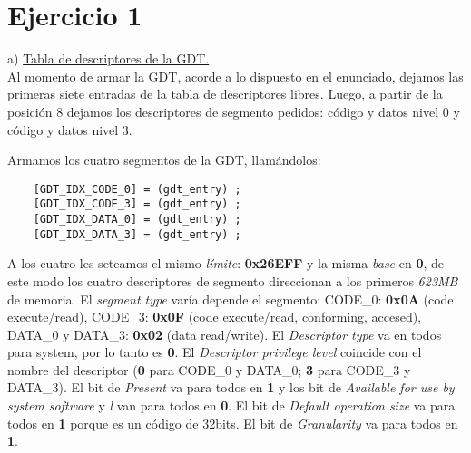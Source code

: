 \documentclass[a4paper]{article}
\begin{document}
\thispagestyle{empty}

 


\maketitle
\newpage


\newpage


\newpage
\section{Ejercicio 1}
{\large a)} \underline{Tabla de descriptores de la GDT.} \\

Al momento de armar la GDT, acorde a lo dispuesto en el enunciado, dejamos las primeras siete entradas de la tabla de descriptores libres. Luego, a partir de la posici\'on 8 dejamos los descriptores de segmento pedidos: c\'odigo y datos nivel 0 y c\'odigo y datos nivel 3.

Armamos los cuatro segmentos de la GDT, llam\'andolos: 
\begin{codesnippet}
\begin{verbatim}
    [GDT_IDX_CODE_0] = (gdt_entry) ; 
    [GDT_IDX_CODE_3] = (gdt_entry) ; 
    [GDT_IDX_DATA_0] = (gdt_entry) ;  
    [GDT_IDX_DATA_3] = (gdt_entry) ; 
\end{verbatim}
\end{codesnippet}
    
A los cuatro les seteamos el mismo \emph{l\'imite}: \textbf{0x26EFF} y la misma \emph{base} en \textbf{0}, de este modo los cuatro descriptores de segmento direccionan a los primeros \emph{623MB} de memoria. El \emph{segment type} var\'ia depende el segmento: CODE_0: \textbf{0x0A} (code execute/read), CODE_3: \textbf{0x0F} (code execute/read, conforming, accesed), DATA_0 y DATA_3: \textbf{0x02} (data read/write). El \emph{Descriptor type} va en todos para system, por lo tanto es \textbf{0}. El \emph{Descriptor privilege level} coincide con el nombre del descriptor (\textbf{0} para CODE_0 y DATA_0; \textbf{3} para CODE_3 y DATA_3). El bit de \emph{Present} va para todos en \textbf{1} y los bit de \emph{Available for use by system software} y \emph{l} van para todos en \textbf{0}. El bit de \emph{Default operation size} va para todos en \textbf{1} porque es un c\'odigo de 32bits. El bit de \emph{Granularity} va para todos en \textbf{1}.\\
    
\end{document}
